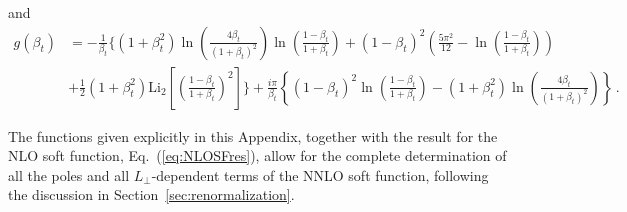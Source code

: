 \documentclass[a4paper,11pt]{article}
\newcommand{\Li}{{\text{Li}}}
\numberwithin{equation}{section}
\begin{document}
%
and
%
\begin{align}
  g(\beta_t) &=
  -\frac{1}{\beta_t}
  \Bigg\{\left(1+\beta_t ^2\right) 
  \ln \left(\frac{4 \beta_t }{(1+\beta_t)^2}\right) 
  \ln \left(\frac{1-\beta_t }{1+\beta_t}\right)+
  (1-\beta_t)^2 \left(\frac{5 \pi ^2}{12}- 
  \ln\left(\frac{1-\beta_t }{1+\beta_t}
  \right)\right)
  \nonumber \\
  & +\frac12 \left(1+\beta_t ^2\right)
  \Li_2\left[\left(\frac{1-\beta_t}{1+\beta_t}\right)^2\right]
  \Bigg\}
  + \frac{i\pi}{\beta_t} 
  \left\{(1-\beta_t)^2 \ln \left(\frac{1-\beta_t }{1+\beta_t}\right)
  -\left(1+\beta_t ^2\right) \ln
  \left(\frac{4 \beta_t }{(1+\beta_t)^2}\right)\right\}\,.
\end{align}

The functions given explicitly in this Appendix, together with the result for
the NLO soft function, Eq.~(\ref{eq:NLOSFres}), allow for the complete
determination of all the poles and all $L_\perp$-dependent terms of the NNLO
soft function, following the discussion in Section~\ref{sec:renormalization}.


%

\end{document}
